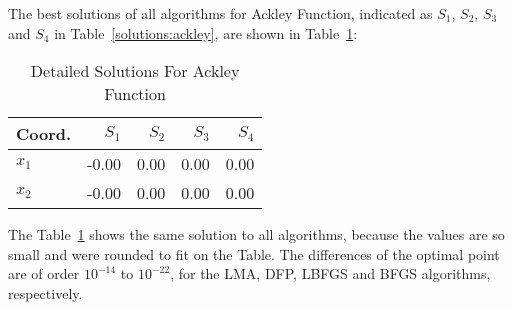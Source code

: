 The best solutions of all algorithms for Ackley Function, indicated as
$S_{1}$, $S_{2}$, $S_{3}$ and $S_{4}$ in Table~\ref{solutions:ackley}, are shown
in Table~\ref{detailedsolutions:ackley}:

\begin{table}[H]
\centering
\caption{Detailed Solutions For Ackley Function}
\label{detailedsolutions:ackley}
\begin{tabular}{lrrrr}
\toprule
 Coord. &  $S_{1}$ &  $S_{2}$ &  $S_{3}$ &  $S_{4}$ \\
\midrule
$x_{1}$ &    -0.00 &     0.00 &     0.00 &     0.00 \\
$x_{2}$ &    -0.00 &     0.00 &     0.00 &     0.00 \\
\bottomrule
\end{tabular}
\end{table}

The Table~\ref{detailedsolutions:ackley} shows the same solution to all algorithms, because the values are so small
and were rounded to fit on the Table. The differences of the optimal point are of order $10^{-14}$ to $10^{-22}$,
for the LMA, DFP, LBFGS and BFGS algorithms, respectively.

